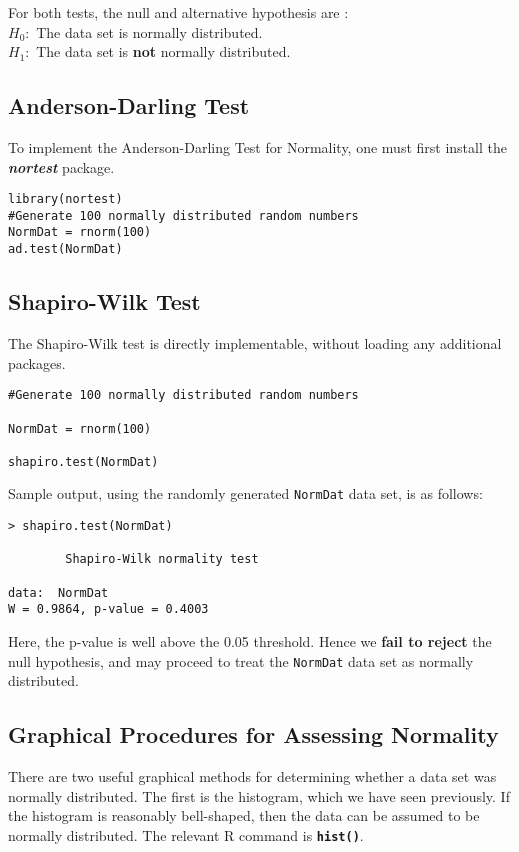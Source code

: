 For both tests, the null and alternative hypothesis are :\\
\qquad $H_0 : $ The data set is normally distributed.\\
\qquad $H_1 : $ The data set is \textbf{not} normally distributed.\\

\subsection{Anderson-Darling Test}
To implement the Anderson-Darling Test for Normality, one must first install the \textbf{\emph{nortest}} package.

\begin{framed}
\begin{verbatim}
library(nortest)
#Generate 100 normally distributed random numbers
NormDat = rnorm(100)
ad.test(NormDat)
\end{verbatim}
\end{framed}
\subsection{Shapiro-Wilk Test}
The Shapiro-Wilk test is directly implementable, without loading any additional packages.

\begin{framed}
\begin{verbatim}
#Generate 100 normally distributed random numbers

NormDat = rnorm(100)

shapiro.test(NormDat)
\end{verbatim}
\end{framed}
Sample output, using the randomly generated \texttt{NormDat} data set, is as follows:
\begin{verbatim}
> shapiro.test(NormDat)

        Shapiro-Wilk normality test

data:  NormDat
W = 0.9864, p-value = 0.4003
\end{verbatim}
Here, the p-value is well above the 0.05 threshold. Hence we \textbf{fail to reject} the null hypothesis, and may proceed to treat the \texttt{NormDat} data set as normally distributed.
\subsection{Graphical Procedures for Assessing Normality}
There are two useful graphical methods for determining whether a data set was normally distributed. The first is the histogram, which we have seen previously. If the histogram is reasonably bell-shaped, then the data can be assumed to be normally distributed. The relevant R command is \texttt{\textbf{hist()}}.


